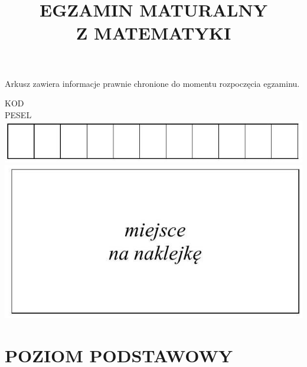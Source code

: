 \documentclass[10pt]{article}
\title{EGZAMIN MATURALNY \\
 Z MATEMATYKI }
\author{}
\date{}
\begin{document}
\maketitle
Arkusz zawiera informacje prawnie chronione do momentu rozpoczęcia egzaminu.

KOD\\
PESEL\\
\includegraphics[max width=\textwidth, center]{2024_11_21_ad8c43efe74fa059d24eg-01}\\
\includegraphics[max width=\textwidth, center]{2024_11_21_ad8c43efe74fa059d24eg-01(1)}

\section*{POZIOM PODSTAWOWY}
\end{document}
